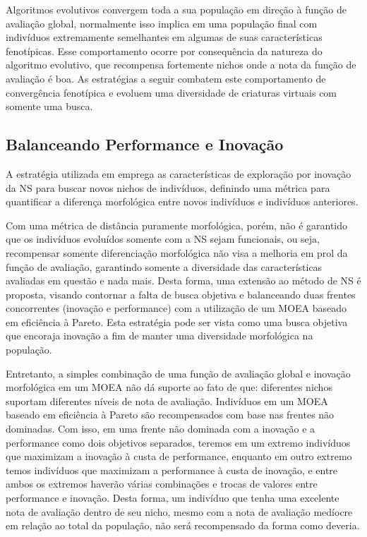 Algoritmos evolutivos convergem toda a sua população em direção à função de avaliação global, normalmente isso implica em uma população final com indivíduos extremamente semelhantes em algumas de suas características fenotípicas. Esse comportamento ocorre por consequência da natureza do algoritmo evolutivo, que recompensa fortemente nichos onde a nota da função de avaliação é boa. As estratégias a seguir combatem este comportamento de convergência fenotípica e evoluem uma diversidade de criaturas virtuais com somente uma busca.

\subsection{Balanceando Performance e Inovação}

A estratégia utilizada em \cite{lehman2011evolving} emprega as características de exploração por inovação da NS para buscar novos nichos de indivíduos, definindo uma métrica para quantificar a diferença morfológica entre novos indivíduos e indivíduos anteriores.

Com uma métrica de distância puramente morfológica, porém, não é garantido que os indivíduos evoluídos somente com a NS sejam funcionais, ou seja, recompensar somente diferenciação morfológica não visa a melhoria em prol da função de avaliação, garantindo somente a diversidade das características avaliadas em questão e nada mais. Desta forma, uma extensão ao método de NS é proposta, visando contornar a falta de busca objetiva e balanceando duas frentes concorrentes (inovação e performance) com a utilização de um MOEA baseado em eficiência à Pareto. Esta estratégia pode ser vista como uma busca objetiva que encoraja inovação a fim de manter uma diversidade morfológica na população.

Entretanto, a simples combinação de uma função de avaliação global e inovação morfológica em um MOEA não dá suporte ao fato de que: diferentes nichos suportam diferentes níveis de nota de avaliação. Indivíduos em um MOEA baseado em eficiência à Pareto são recompensados com base nas frentes não dominadas. Com isso, em uma frente não dominada com a inovação e a performance como dois objetivos separados, teremos em um extremo indivíduos que maximizam a inovação à custa de performance, enquanto em outro extremo temos indivíduos que maximizam a performance à custa de inovação, e entre ambos os extremos haverão várias combinações e trocas de valores entre performance e inovação. Desta forma, um indivíduo que tenha uma excelente nota de avaliação dentro de seu nicho, mesmo com a nota de avaliação medíocre em relação ao total da população, não será recompensado da forma como deveria.

